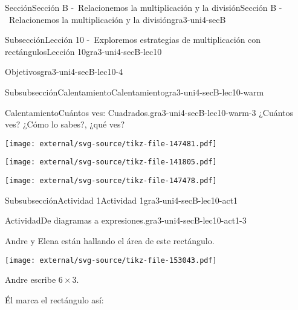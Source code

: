 \documentclass[twoside,10pt,]{article}
\begin{document}
\begin{sectionptx}{Sección}{Sección B -~Relacionemos la multiplicación y la división}{}{Sección B -~Relacionemos la multiplicación y la división}{}{}{gra3-uni4-secB}
\begin{subsectionptx}{Subsección}{Lección 10 -~Exploremos estrategias de multiplicación con rectángulos}{}{Lección 10}{}{}{gra3-uni4-secB-lec10}
\begin{objectives}{Objetivos}{gra3-uni4-secB-lec10-4}
\begin{itemize}[label=\textbullet]
\end{itemize}
\end{objectives}
%
%
\typeout{************************************************}
\typeout{************************************************}
%
\begin{subsubsectionptx}{Subsubsección}{Calentamiento}{}{Calentamiento}{}{}{gra3-uni4-secB-lec10-warm}
\begin{exploration}{Calentamiento}{Cuántos ves: Cuadrados.}{gra3-uni4-secB-lec10-warm-3}%
¿Cuántos ves? ¿Cómo lo sabes?, ¿qué ves?%
\begin{image}{0}{1}{0}{}%
\texttt{[image: external/svg-source/tikz-file-147481.pdf]}
\end{image}%
\begin{image}{0}{1}{0}{}%
\texttt{[image: external/svg-source/tikz-file-141805.pdf]}
\end{image}%
\begin{image}{0}{1}{0}{}%
\texttt{[image: external/svg-source/tikz-file-147478.pdf]}
\end{image}%
\end{exploration}%
\end{subsubsectionptx}
%
%
\typeout{************************************************}
\typeout{************************************************}
%
\begin{subsubsectionptx}{Subsubsección}{Actividad 1}{}{Actividad 1}{}{}{gra3-uni4-secB-lec10-act1}
\begin{activity}{Actividad}{De diagramas a expresiones.}{gra3-uni4-secB-lec10-act1-3}%
\begin{sidebyside}{2}{0.025}{0.025}{0.05}%
\begin{sbspanel}{0.4}%
Andre y Elena están hallando el área de este rectángulo.%
\end{sbspanel}%
\begin{sbspanel}{0.5}%
\texttt{[image: external/svg-source/tikz-file-153043.pdf]}
\end{sbspanel}%
\end{sidebyside}%
\begin{sidebyside}{3}{0}{0}{0.065}%
\begin{sbspanel}{0.27}%
Andre escribe \(6\times 3\).%
\end{sbspanel}%
\begin{sbspanel}{0.35}%
Él marca el rectángulo así:%
\par

\end{sbspanel}
\end{sidebyside}
\end{activity}
\end{subsubsectionptx}
\end{subsectionptx}
\end{sectionptx}
\end{document}
